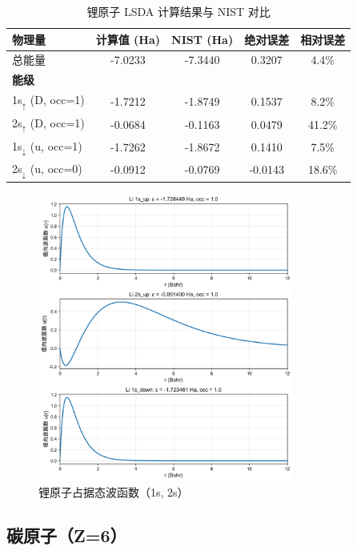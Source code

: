 \documentclass[12pt,a4paper]{article}
\begin{document}
\begin{table}[H]
    \centering
    \caption{锂原子 LSDA 计算结果与 NIST 对比}
    \begin{tabular}{lcccc}
        \toprule
        物理量                        & 计算值 (Ha) & NIST (Ha) & 绝对误差    & 相对误差   \\
        \midrule
        总能量                        & -7.0233  & -7.3440   & 0.3207  & 4.4\%  \\
        \midrule
        \multicolumn{5}{l}{\textbf{能级}}                                      \\
        1s$_\uparrow$ (D, occ=1)   & -1.7212  & -1.8749   & 0.1537  & 8.2\%  \\
        2s$_\uparrow$ (D, occ=1)   & -0.0684  & -0.1163   & 0.0479  & 41.2\% \\
        1s$_\downarrow$ (u, occ=1) & -1.7262  & -1.8672   & 0.1410  & 7.5\%  \\
        2s$_\downarrow$ (u, occ=0) & -0.0912  & -0.0769   & -0.0143 & 18.6\% \\
        \bottomrule
    \end{tabular}
\end{table}

\begin{figure}[H]
    \centering
    \includegraphics[width=0.75\textwidth]{figures/Li_lsda.png}
    \caption{锂原子占据态波函数（1s, 2s）}
\end{figure}

\subsection{碳原子（Z=6）}
\end{document}
